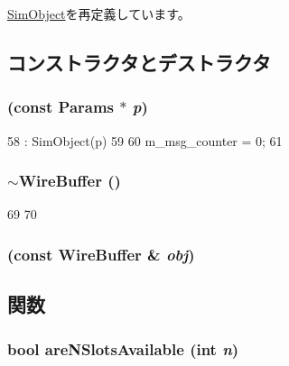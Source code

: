 \hyperlink{classSimObject_a0f0761d2db586a23bb2a2880b8f387bb}{SimObject}を再定義しています。

\subsection{コンストラクタとデストラクタ}
\hypertarget{classWireBuffer_ae9a9cdc14adf2ac6984bab0b253d2cec}{
\subsubsection[{WireBuffer}]{ (const {\bf Params} $\ast$ {\em p})}}
\label{classWireBuffer_ae9a9cdc14adf2ac6984bab0b253d2cec}



\begin{DoxyCode}
58     : SimObject(p)
59 {
60     m_msg_counter = 0;
61 }
\end{DoxyCode}
\hypertarget{classWireBuffer_ab5bf2bdbeae187001e2184d5fdf106c8}{
\subsubsection[{$\sim$WireBuffer}]{\setlength{\rightskip}{0pt plus 5cm}$\sim${\bf WireBuffer} ()}}
\label{classWireBuffer_ab5bf2bdbeae187001e2184d5fdf106c8}



\begin{DoxyCode}
69 {
70 }
\end{DoxyCode}
\hypertarget{classWireBuffer_af3ac0ff9352e0f326be850ddb42f95d5}{
\subsubsection[{WireBuffer}]{ (const {\bf WireBuffer} \& {\em obj})}}
\label{classWireBuffer_af3ac0ff9352e0f326be850ddb42f95d5}


\subsection{関数}
\hypertarget{classWireBuffer_a99a0d76f7266570912e6b0901cfaf9cf}{
\subsubsection[{areNSlotsAvailable}]{\setlength{\rightskip}{0pt plus 5cm}bool areNSlotsAvailable (int {\em n})}}
\label{classWireBuffer_a99a0d76f7266570912e6b0901cfaf9cf}



